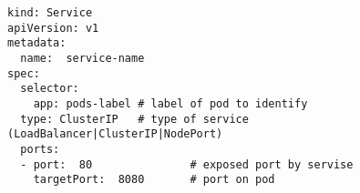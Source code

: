 \begin{lstfloat}
\begin{lstlisting}[style=mybashstyle,
caption={Ukázka reprezentace objektu SERVICE},
label={sample:service}
]
kind: Service
apiVersion: v1
metadata:
  name:  service-name
spec:
  selector:
    app: pods-label # label of pod to identify 
  type: ClusterIP   # type of service (LoadBalancer|ClusterIP|NodePort)
  ports:
  - port:  80               # exposed port by servise
    targetPort:  8080       # port on pod
\end{lstlisting}
\end{lstfloat}